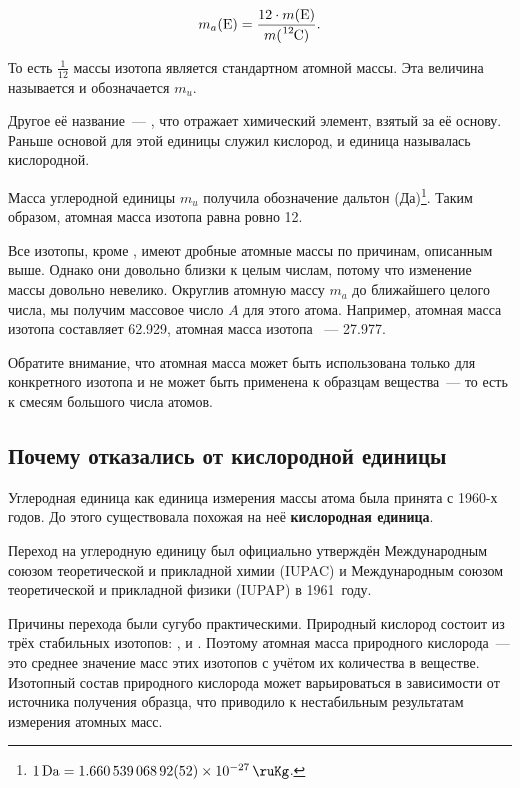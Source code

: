 \begin{equation*}
    m_a(\ce{E}) = \frac{12 \cdot m(\ce{E})}{m(\ce{^12C})}.
\end{equation*}

То есть $\frac{1}{12}$ массы изотопа  является стандартном атомной массы. Эта величина называется  и обозначается $m_u$.

Другое её название~--- , что отражает химический элемент, взятый за её основу. Раньше основой для этой единицы служил кислород, и единица называлась кислородной.

Масса углеродной единицы $m_u$ получила обозначение дальтон (Да)\footnote{$\qty{1}{Da} = \qty{1,66053906892(52)e-27}{\ruKg}$.}. Таким образом, атомная масса изотопа  равна ровно \qty{12}{\ruDa}.

Все изотопы, кроме , имеют дробные атомные массы по причинам, описанным выше. Однако они довольно близки к целым числам, потому что изменение массы довольно невелико. Округлив атомную массу $m_a$ до ближайшего целого числа, мы получим массовое число $A$ для этого атома. Например, атомная масса изотопа  составляет \qty{62,929}{\ruDa}, атомная масса изотопа ~--- \qty{27,977}{\ruDa}.

Обратите внимание, что атомная масса может быть использована только для конкретного изотопа и не может быть применена к образцам вещества~--- то есть к смесям большого числа атомов.

\subsection*{Почему отказались от кислородной единицы}

Углеродная единица как единица измерения массы атома была принята с 1960-х годов. До этого существовала похожая на неё \textbf{кислородная единица}.

Переход на углеродную единицу был официально утверждён Международным союзом теоретической и прикладной химии (IUPAC) и Международным союзом теоретической и прикладной физики (IUPAP) в 1961~году.

Причины перехода были сугубо практическими. Природный кислород состоит из трёх стабильных изотопов: ,  и . Поэтому атомная масса природного кислорода~--- это среднее значение масс этих изотопов с учётом их количества в веществе. Изотопный состав природного кислорода может варьироваться в зависимости от источника получения образца, что приводило к нестабильным результатам измерения атомных масс.

